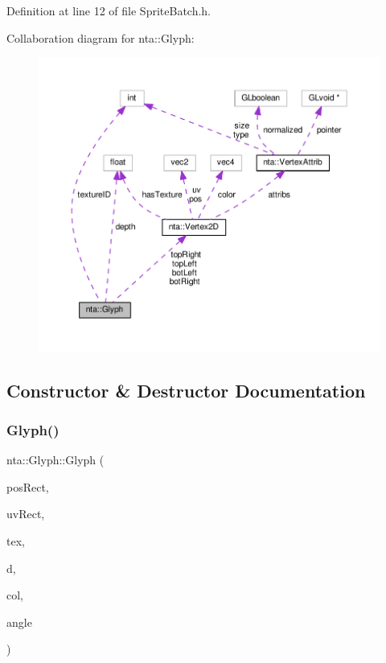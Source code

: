 Definition at line 12 of file Sprite\+Batch.\+h.



Collaboration diagram for nta\+:\+:Glyph\+:\nopagebreak
\begin{figure}[H]
\begin{center}
\leavevmode
\includegraphics[width=350pt]{d8/d54/structnta_1_1Glyph__coll__graph}
\end{center}
\end{figure}


\subsection{Constructor \& Destructor Documentation}
\mbox{\label{structnta_1_1Glyph_a3b2afa4370140736d9d1b28de20d2105}} 
\subsubsection{\texorpdfstring{Glyph()}{Glyph()}}
{\footnotesize\ttfamily nta\+::\+Glyph\+::\+Glyph (\begin{DoxyParamCaption}\item[{crvec4}]{pos\+Rect,  }\item[{crvec4}]{uv\+Rect,  }\item[{G\+Luint}]{tex,  }\item[{float}]{d,  }\item[{crvec4}]{col,  }\item[{float}]{angle }\end{DoxyParamCaption})\hspace{0.3cm}{\ttfamily [inline]}}

